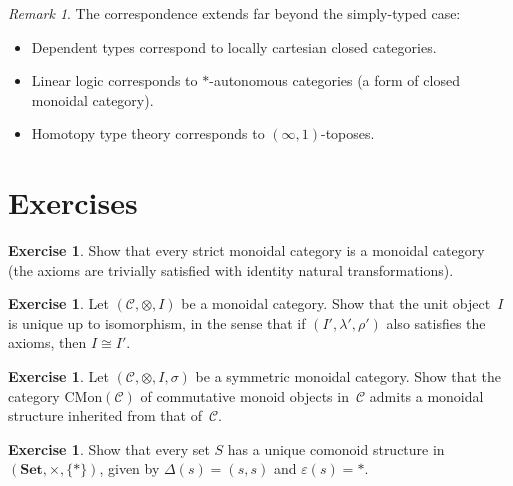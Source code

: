 \documentclass[a4paper,12pt]{book}
\newcommand{\Set}{\mathbf{Set}}
\theoremstyle{definition}
\newtheorem{exercise}[definition]{Exercise}
\theoremstyle{plain}
\theoremstyle{remark}
\newtheorem{remark}[definition]{Remark}
\begin{document}
\begin{remark}\label{rem:curry-howard-extensions}
The correspondence extends far beyond the simply-typed case:
\begin{itemize}
\item Dependent types correspond to locally cartesian closed categories.
\item Linear logic corresponds to $*$-autonomous categories (a form of
      closed monoidal category).
\item Homotopy type theory corresponds to $(\infty,1)$-toposes.
\end{itemize}
\end{remark}



\section{Exercises}\label{sec:monoidal-exercises}

\begin{exercise}\label{ex:strict-is-monoidal}
Show that every strict monoidal category is a monoidal category
(the axioms are trivially satisfied with identity natural transformations).
\end{exercise}

\begin{exercise}\label{ex:monoidal-unique-unit}
Let $(\mathcal{C}, \otimes, I)$ be a monoidal category.  Show that the
unit object~$I$ is unique up to isomorphism, in the sense that if
$(I', \lambda', \rho')$ also satisfies the axioms, then $I\cong I'$.
\end{exercise}

\begin{exercise}\label{ex:commutative-monoid-object}
Let $(\mathcal{C}, \otimes, I, \sigma)$ be a symmetric monoidal category.
Show that the category $\mathrm{CMon}(\mathcal{C})$ of commutative monoid
objects in~$\mathcal{C}$ admits a monoidal structure inherited from that
of~$\mathcal{C}$.
\end{exercise}

\begin{exercise}\label{ex:comonoid-in-set}
\index{comonoid object!in $\Set$}
Show that every set $S$ has a unique comonoid structure in
$(\Set, \times, \{*\})$, given by $\Delta(s) = (s,s)$ and
$\varepsilon(s) = *$.
\end{exercise}
\end{document}
